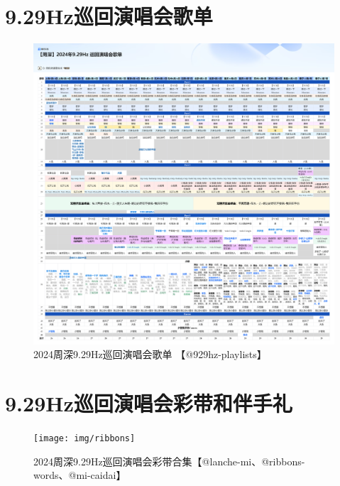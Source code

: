\documentclass[]{ctexbook}
\begin{document}
\appendix {}


\chapter{9.29Hz巡回演唱会歌单}\label{playlists}

\begin{figure}

{\centering \includegraphics{img/playlists/playlists} 

}

\caption{2024周深9.29Hz巡回演唱会歌单 【@929hz-playlists】}\label{fig:unnamed-chunk-186}
\end{figure}

\chapter{9.29Hz巡回演唱会彩带和伴手礼}\label{appendix-gift}

\begin{figure}

{\centering \texttt{[image: img/ribbons]} 

}

\caption{2024周深9.29Hz巡回演唱会彩带合集【@lanche-mi、@ribbons-words、@mi-caidai】}\label{fig:unnamed-chunk-188}
\end{figure}
\end{document}
